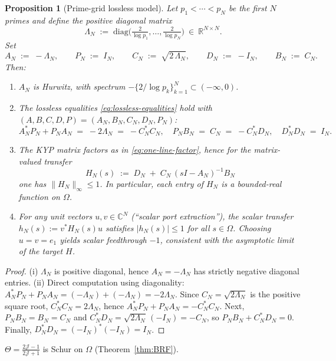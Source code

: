 \documentclass[11pt]{article}
\newtheorem{proposition}[theorem]{Proposition}
\theoremstyle{definition}
\theoremstyle{remark}
\newcommand{\C}{\mathbb{C}}
\newcommand{\R}{\mathbb{R}}
\begin{document}
\begin{proposition}[Prime-grid lossless model]\label{prop:prime-grid-KYP}
Let \(p_1<\cdots<p_N\) be the first \(N\) primes and define the positive diagonal matrix
\[
 \Lambda_N\;:=\;\mathrm{diag}\!\Big(\tfrac{2}{\log p_1},\dots,\tfrac{2}{\log p_N}\Big)\ \in\ \R^{N\times N}.
\]
Set
\[
 A_N\;:=\;-\Lambda_N,\qquad P_N\;:=\;I_N,\qquad C_N\;:=\;\sqrt{2\,\Lambda_N},\qquad D_N\;:=\;-I_N,\qquad B_N\;:=\;C_N.
\]
Then:
\begin{enumerate}
 \item \(A_N\) is Hurwitz, with spectrum \(-\{2/\log p_k\}_{k=1}^N\subset(-\infty,0)\).
 \item The lossless equalities \eqref{eq:lossless-equalities} hold with \((A,B,C,D,P)=(A_N,B_N,C_N,D_N,P_N)\):
 \[
  A_N^*P_N+P_NA_N\;=\;-2\Lambda_N\;=\;-C_N^*C_N,\quad P_NB_N\;=\;C_N\;=\;-C_N^*D_N,\quad D_N^*D_N\;=\;I_N.
 \]
 \item The KYP matrix factors as in \eqref{eq:one-line-factor}, hence for the matrix-valued transfer
 \[
  H_N(s)\;:=\;D_N\; +\; C_N\,(sI-A_N)^{-1} B_N
 \]
one has \(\|H_N\|_\infty\le 1\). In particular, each entry of \(H_N\) is a bounded-real function on \(\Omega\).
 \item For any unit vectors \(u,v\in\C^N\) (``scalar port extraction''), the scalar transfer \(h_N(s):=v^*H_N(s)u\) satisfies \(|h_N(s)|\le 1\) for all \(s\in\Omega\). Choosing \(u=v=e_1\) yields scalar feedthrough \(-1\), consistent with the asymptotic limit of the target \(H\).
\end{enumerate}
\end{proposition}
\begin{proof}
(i) \(\Lambda_N\) is positive diagonal, hence \(A_N=-\Lambda_N\) has strictly negative diagonal entries.
(ii) Direct computation using diagonality: \(A_N^*P_N+P_NA_N=(-\Lambda_N)+(-\Lambda_N)=-2\Lambda_N\). Since \(C_N=\sqrt{2\Lambda_N}\) is the positive square root, \(C_N^*C_N=2\Lambda_N\), hence \(A_N^*P_N+P_NA_N=-C_N^*C_N\). Next, \(P_NB_N=B_N=C_N\) and \(C_N^*D_N=\sqrt{2\Lambda_N}\,(-I_N)=-C_N\), so \(P_NB_N+ C_N^*D_N=0\). Finally, \(D_N^*D_N=(-I_N)^*(-I_N)=I_N\).
\end{proof}

\(\Theta=\frac{2\mathcal J-1}{2\mathcal J+1}\) is Schur on \(\Omega\) (Theorem~\ref{thm:BRF}).
\end{document}
